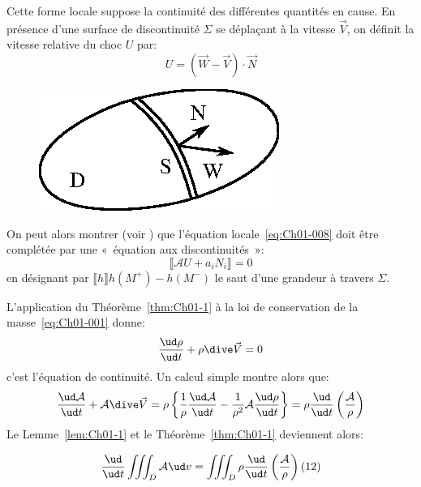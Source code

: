 Cette forme locale suppose la continuité des différentes quantités en cause.
En présence d'une surface de discontinuité $\Sigma$ se déplaçant à la vitesse $\vec{V}$, on définit la vitesse relative du choc $U$ par:
\begin{equation}
    U=(\vec{W}-\vec{V})\cdot \vec{N}
    \label{eq:Ch01-009}
\end{equation}
\begin{figure}
    \includegraphics{../images/T1_Ch01-0006}
\end{figure}
On peut alors montrer (voir \cite{Germain-73}) que l'équation locale~\eqref{eq:Ch01-008} doit être complétée par une «~équation aux discontinuités~»:
\begin{equation}
    \llbracket\mathcal{A}U + a_iN_i\rrbracket = 0 
    \label{eq:Ch01-010}
\end{equation}
en désignant par $\llbracket h \rrbracket h(M^+)-h(M^-)$ le saut d'une grandeur à travers $\Sigma$.

L'application du Théorème~\ref{thm:Ch01-1} à la loi de conservation de la masse~\eqref{eq:Ch01-001} donne:
\begin{equation}
    \frac{\ud \rho}{\ud t}+\rho \dive \vec{V}=0
    \label{eq:Ch01-011}
\end{equation}
c'est l'équation de continuité.
Un calcul simple montre alors que:
\begin{equation*}
    \frac{\ud\mathcal{A}}{\ud t}+\mathcal{A}\dive \vec{V}=\rho\left\{\frac{1}{\rho}\frac{\ud \mathcal{A}}{\ud t}-\frac{1}{\rho^2}\mathcal{A}\frac{\ud \rho}{\ud t}\right\}=\rho \frac{\ud}{\ud t}\left(\frac{\mathcal{A}}{\rho}\right)
\end{equation*}
Le Lemme~\ref{lem:Ch01-1} et le Théorème~\ref{thm:Ch01-1} deviennent alors:
\begin{lem}
    \begin{equation}
        \frac{\ud}{\ud t}\iiint_D\mathcal{A}\ud v=\iiint_D\rho\frac{\ud}{\ud t}\left(\frac{\mathcal{A}}{\rho}\right)(12)
        \label{eq:Ch01-012}
    \end{equation}
    \label{lem:Ch01-1p}
\end{lem}

